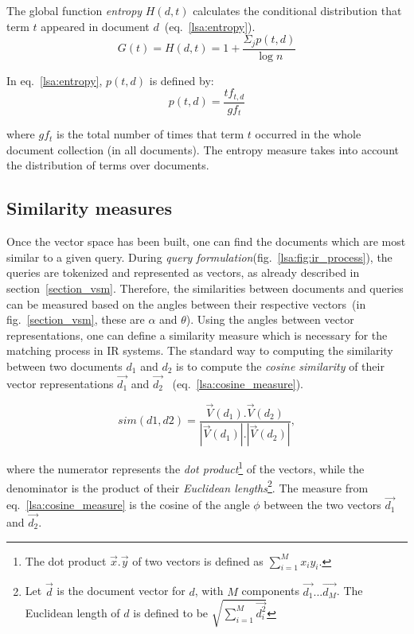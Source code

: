 The global function \textit{entropy} $H(d,t)$ calculates the conditional distribution that term $t$ appeared in document $d$~(eq.~\ref{lsa:entropy}). \\

\begin{equation}
G(t) = H(d,t) = 1+\frac{{\Sigma_{j}p(t,d)}}{\log n}
\label{lsa:entropy}
\end{equation}

In eq.~\ref{lsa:entropy}, $p(t,d)$ is defined by:
\begin{equation}
p(t,d) = \frac{tf_{t,d}}{gf_{t}}
\end{equation}

where $gf_{t}$ is the total number of times that term $t$ occurred in the whole document collection (in all documents). The entropy measure takes into account the distribution of terms over documents. \\

\subsection{Similarity measures}
\label{lsa:similarity_measures}
Once the vector space has been built, one can find the documents which are most similar to a given query. During \textit{query formulation}(fig.~\ref{lsa:fig:ir_process}), the queries are tokenized and represented as vectors, as already described in section~\ref{section_vsm}. Therefore, the similarities between documents and queries can be measured based on the angles between their respective vectors~(in fig.~\ref{section_vsm}, these are $ \alpha $ and $ \theta $). Using the angles between vector representations, one can define a similarity measure which is necessary for the matching process in \gls{IR} systems. The standard way to computing the similarity between two documents $d_{1}$ and $d_{2}$ is to compute the \textit{cosine similarity} of their vector representations $\overrightarrow{d_1}$ and $\overrightarrow{d_2}$ ~(eq.~\ref{lsa:cosine_measure}).

%
%
\begin{equation}
\label{lsa:cosine_measure}
sim(d1,d2)=\frac{\overrightarrow{V}(d_1).\overrightarrow{V}(d_2)}{\left\vert \overrightarrow{V}(d_1) \right\vert.\left\vert \overrightarrow{V}(d_2)\right\vert},
\end{equation}

where the numerator represents the \textit{dot product}\footnote{The dot product $\overrightarrow{x}.\overrightarrow{y}$ of two vectors is defined as $\displaystyle\sum\limits_{i=1}^{M} x_{i}y_{i} $.} of the vectors, while the denominator is the product of their \textit{Euclidean lengths}\footnote{Let $\overrightarrow{d}$ is the document vector for $d$, with $M$ components $\overrightarrow{d_{1}}...\overrightarrow{d_{M}}$. The Euclidean length of $d$ is defined to be $ \sqrt{\sum\limits_{i=1}^{M} \overrightarrow{d_{i}^2}} $}. The measure from eq.~\ref{lsa:cosine_measure} is the cosine of the angle $ \phi $ between the two vectors $\overrightarrow{d_1}$ and $\overrightarrow{d_2}$. \\

